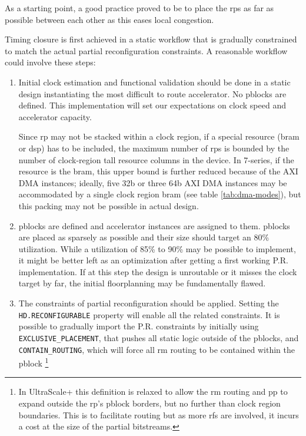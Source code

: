 As a starting point, a good practice proved to be to place the \glspl{rp}
as far as possible between each other as this eases local congestion.

Timing closure is first achieved in a static workflow that is gradually constrained
to match the actual partial reconfiguration constraints.
A reasonable workflow could involve these steps:

\begin{enumerate}
\item	Initial clock estimation and functional validation should be done
	in a static design instantiating the most difficult to route accelerator.
	No \glspl{pblock} are defined.
	This implementation will set our expectations on clock speed and
	accelerator capacity.

	Since \gls{rp} may not be stacked within a clock region,
	if a special resource (\gls{bram} or \gls{dsp}) has to be included,
	the maximum number of \glspl{rp} is bounded
	by the number of clock-region tall resource columns in the device.
	In 7-series, if the resource is the \gls{bram}, this upper bound is
	further reduced because of the AXI DMA instances;
	ideally, five 32b or three 64b AXI DMA instances may be accommodated by
	a single clock region \gls{bram} (see table \ref{tab:dma-modes}),
	but this packing may not be possible in actual design.

\item	\Glspl{pblock} are defined and accelerator instances are assigned
	to them. \Glspl{pblock} are placed as sparsely as possible
	and their size should target an 80\% utilization.
	While a utilization of 85\% to 90\% may be possible to implement,
	it might be better left as an optimization after getting
	a first working P.R. implementation. If at this step the
	design is unroutable or it misses the clock target by far,
	the initial floorplanning may be fundamentally flawed.

\item	The constraints of partial reconfiguration should be applied.
	Setting the \texttt{HD.RECONFIGURABLE} property will enable
	all the related constraints.
	It is possible to gradually import the P.R. constraints by
	initially using \texttt{EXCLUSIVE\_PLACEMENT}, that pushes all
	static logic outside of the \glspl{pblock}, and \texttt{CONTAIN\_ROUTING},
	which will force all \gls{rm} routing to be contained within the \gls{pblock}
	\footnote{In UltraScale+ this definition is relaxed to allow the \gls{rm} routing
	and \gls{pp} to expand outside the \gls{rp}'s \gls{pblock} borders, but no further
	than clock region boundaries. This is to facilitate routing but as more \glspl{rf}
	are involved, it incurs a cost at the size of the partial bitstreams.}


\end{enumerate}
